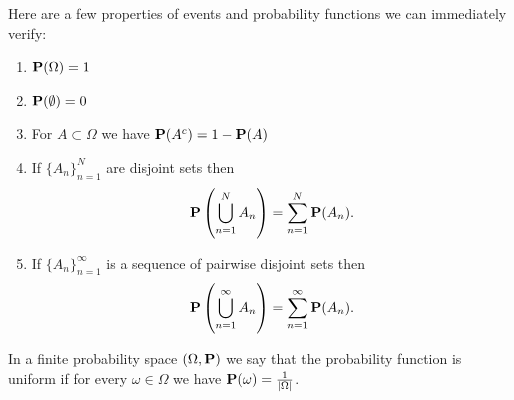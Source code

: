 \documentclass[11pt,a4paper]{article}
\begin{document}
\begin{remark}
  Here are a few properties of events and
  probability functions we can immediately verify:
  \begin{enumerate}
    \item[(1)] $\mathbf{P}(\Omega) = 1$
    \item[(2)] $\mathbf{P}(\emptyset) = 0$
    \item[(3)] For $A \subset \Omega$ we have $\mathbf{P}(A^c) = 1 - \mathbf{P}(A)$
    \item[(4)] If $\{A_n\}_{n=1}^{N}$ are disjoint sets then 
      \[
        \Prob\del{\bigcup_{n=1}^{N}{A_n}} = 
        \sum_{n=1}^{N}{\Prob(A_n)}.
      \]
    \item[(5)] If $\{A_n\}_{n=1}^{\infty}$ is a sequence of
      pairwise disjoint sets then
      \[
        \Prob\del{\bigcup_{n=1}^{\infty}{A_n}} = 
        \sum_{n=1}^{\infty}{\Prob(A_n)}.
      \]
  \end{enumerate}
\end{remark}

\begin{definition}
  In a finite probability space $(\Omega,\mathbf{P})$
  we say that the probability function is uniform
  if for every $\omega \in \Omega$ we have 
  $\mathbf{P}(\omega) = \frac{1}{|\Omega|}$.
\end{definition}
\end{document}
